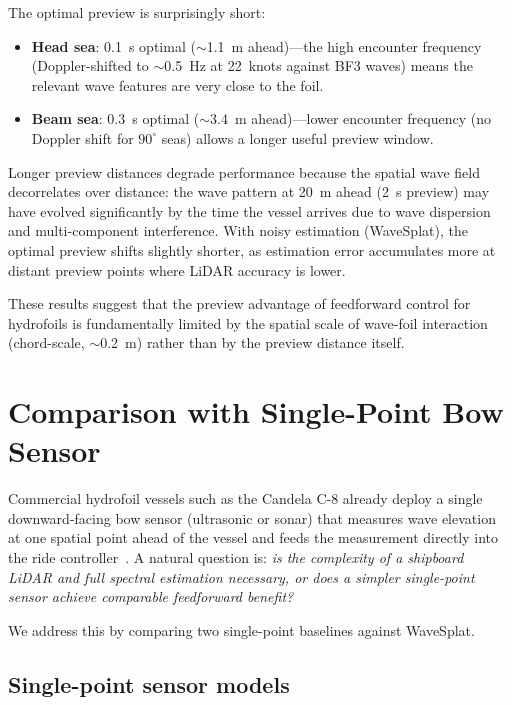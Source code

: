 \documentclass[review]{elsarticle}
\begin{document}
The optimal preview is surprisingly short:
\begin{itemize}
  \item \textbf{Head sea}: 0.1~s optimal ($\sim$1.1~m ahead)---the
    high encounter frequency (Doppler-shifted to $\sim$0.5~Hz at
    22~knots against BF3 waves) means the relevant wave features are
    very close to the foil.
  \item \textbf{Beam sea}: 0.3~s optimal ($\sim$3.4~m ahead)---lower
    encounter frequency (no Doppler shift for $90^\circ$ seas) allows
    a longer useful preview window.
\end{itemize}

Longer preview distances degrade performance because the spatial
wave field decorrelates over distance: the wave pattern at 20~m
ahead (2~s preview) may have evolved significantly by the time the
vessel arrives due to wave dispersion and multi-component
interference.
With noisy estimation (WaveSplat), the optimal preview shifts
slightly shorter, as estimation error accumulates more at distant
preview points where LiDAR accuracy is lower.

These results suggest that the preview advantage of feedforward
control for hydrofoils is fundamentally limited by the spatial
scale of wave-foil interaction (chord-scale, $\sim$0.2~m) rather
than by the preview distance itself.

\section{Comparison with Single-Point Bow Sensor}
\label{sec:single_point}

Commercial hydrofoil vessels such as the Candela C-8 already deploy a
single downward-facing bow sensor (ultrasonic or sonar) that measures
wave elevation at one spatial point ahead of the vessel and feeds the
measurement directly into the ride controller~\citep{candela2023}.
A natural question is: \emph{is the complexity of a shipboard LiDAR and
full spectral estimation necessary, or does a simpler single-point sensor
achieve comparable feedforward benefit?}

We address this by comparing two single-point baselines against WaveSplat.

\subsection{Single-point sensor models}
\end{document}
